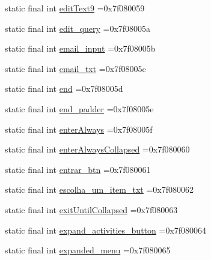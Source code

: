 \begin{DoxyCompactItemize}
\item 
static final int \mbox{\hyperlink{classbr_1_1unb_1_1cic_1_1mp_1_1marketmaster_1_1R_1_1id_ae7a1ff49a33339eea8acb50d8ccef483}{edit\+Text9}} =0x7f080059
\item 
static final int \mbox{\hyperlink{classbr_1_1unb_1_1cic_1_1mp_1_1marketmaster_1_1R_1_1id_a6b9ecf82caa4211c87f72ada15f5d513}{edit\+\_\+query}} =0x7f08005a
\item 
static final int \mbox{\hyperlink{classbr_1_1unb_1_1cic_1_1mp_1_1marketmaster_1_1R_1_1id_a40ef628651625cd3dc2cafe4f85d0c71}{email\+\_\+input}} =0x7f08005b
\item 
static final int \mbox{\hyperlink{classbr_1_1unb_1_1cic_1_1mp_1_1marketmaster_1_1R_1_1id_aeaa8aeefe241280e6c1fdc29f60be720}{email\+\_\+txt}} =0x7f08005c
\item 
static final int \mbox{\hyperlink{classbr_1_1unb_1_1cic_1_1mp_1_1marketmaster_1_1R_1_1id_a3be4612bb746846fd30b28bb95ad1bc1}{end}} =0x7f08005d
\item 
static final int \mbox{\hyperlink{classbr_1_1unb_1_1cic_1_1mp_1_1marketmaster_1_1R_1_1id_a7bc18199474f48f00b42514b2a52183f}{end\+\_\+padder}} =0x7f08005e
\item 
static final int \mbox{\hyperlink{classbr_1_1unb_1_1cic_1_1mp_1_1marketmaster_1_1R_1_1id_aa49f4dacc8c0980820a843c15b6708a9}{enter\+Always}} =0x7f08005f
\item 
static final int \mbox{\hyperlink{classbr_1_1unb_1_1cic_1_1mp_1_1marketmaster_1_1R_1_1id_a3161401455bac2d17a0187015a7feaad}{enter\+Always\+Collapsed}} =0x7f080060
\item 
static final int \mbox{\hyperlink{classbr_1_1unb_1_1cic_1_1mp_1_1marketmaster_1_1R_1_1id_a93a1b5e1330332cc895372f18e758661}{entrar\+\_\+btn}} =0x7f080061
\item 
static final int \mbox{\hyperlink{classbr_1_1unb_1_1cic_1_1mp_1_1marketmaster_1_1R_1_1id_a837a9d987e93e8be20890fc902e85422}{escolha\+\_\+um\+\_\+item\+\_\+txt}} =0x7f080062
\item 
static final int \mbox{\hyperlink{classbr_1_1unb_1_1cic_1_1mp_1_1marketmaster_1_1R_1_1id_ac2356c32872253b0fafd927943e0f92a}{exit\+Until\+Collapsed}} =0x7f080063
\item 
static final int \mbox{\hyperlink{classbr_1_1unb_1_1cic_1_1mp_1_1marketmaster_1_1R_1_1id_a30e7f1e4946c12fc1d958bbe7603e54a}{expand\+\_\+activities\+\_\+button}} =0x7f080064
\item 
static final int \mbox{\hyperlink{classbr_1_1unb_1_1cic_1_1mp_1_1marketmaster_1_1R_1_1id_a075b8ca837e831daf25e0f7577fccc21}{expanded\+\_\+menu}} =0x7f080065

\end{DoxyCompactItemize}
